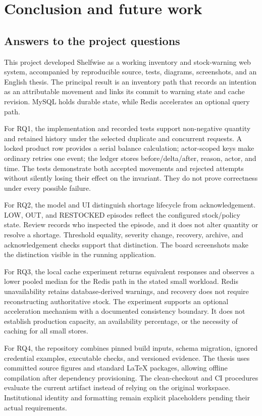 \chapter{Conclusion and future work}\label{ch:conclusion}
\section{Answers to the project questions}
This project developed Shelfwise as a working inventory and stock-warning web system, accompanied by reproducible source, tests, diagrams, screenshots, and an English thesis. The principal result is an inventory path that records an intention as an attributable movement and links its commit to warning state and cache revision. MySQL holds durable state, while Redis accelerates an optional query path.

For RQ1, the implementation and recorded tests support non-negative quantity and retained history under the selected duplicate and concurrent requests. A locked product row provides a serial balance calculation; actor-scoped keys make ordinary retries one event; the ledger stores before/delta/after, reason, actor, and time. The tests demonstrate both accepted movements and rejected attempts without silently losing their effect on the invariant. They do not prove correctness under every possible failure.

For RQ2, the model and UI distinguish shortage lifecycle from acknowledgement. LOW, OUT, and RESTOCKED episodes reflect the configured stock/policy state. Review records who inspected the episode, and it does not alter quantity or resolve a shortage. Threshold equality, severity change, recovery, archive, and acknowledgement checks support that distinction. The board screenshots make the distinction visible in the running application.

For RQ3, the local cache experiment returns equivalent responses and observes a lower pooled median for the Redis path in the stated small workload. Redis unavailability retains database-derived warnings, and recovery does not require reconstructing authoritative stock. The experiment supports an optional acceleration mechanism with a documented consistency boundary. It does not establish production capacity, an availability percentage, or the necessity of caching for all small stores.

For RQ4, the repository combines pinned build inputs, schema migration, ignored credential examples, executable checks, and versioned evidence. The thesis uses committed source figures and standard LaTeX packages, allowing offline compilation after dependency provisioning. The clean-checkout and CI procedures evaluate the current artifact instead of relying on the original workspace. Institutional identity and formatting remain explicit placeholders pending their actual requirements.

